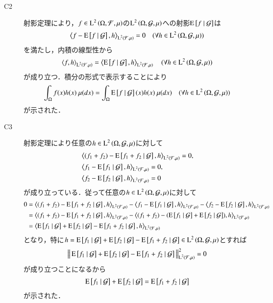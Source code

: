 \begin{prf}
\begin{description}
			\item[C2] 
				射影定理により，$f \in \operatorname{L}^{2} \left(\Omega, \mathcal{F},\mu\right)$の$\operatorname{L}^{2} \left(\Omega, \mathcal{G},\mu\right)$への射影$\operatorname{E} \left[ f \ \middle|\ \mathcal{G} \right]$は
				\begin{align}
					\inprod<f - \cexp{f}{\mathcal{G}}, h>_{\Lp{2}{\mathcal{F},\mu}} = 0 \quad (\forall h \in \Lp{2}{\Omega, \mathcal{G},\mu})
				\end{align}
				を満たし，内積の線型性から
				\begin{align}
					\inprod<f, h>_{\Lp{2}{\mathcal{F},\mu}} = \inprod<\cexp{f}{\mathcal{G}}, h>_{\Lp{2}{\mathcal{F},\mu}} \quad (\forall h \in \Lp{2}{\Omega, \mathcal{G},\mu})
				\end{align}
				が成り立つ．積分の形式で表示することにより
				\begin{align}
					\int_{\Omega} f(x)h(x)\ \mu(dx) = \int_{\Omega} \operatorname{E} \left[ f \ \middle|\ \mathcal{G} \right](x)h(x)\ \mu(dx) \quad (\forall h \in \operatorname{L}^{2} \left(\Omega, \mathcal{G},\mu\right))
				\end{align}
				が示された．
				
			\item[C3] 
				射影定理により任意の$h \in \operatorname{L}^{2} \left(\Omega, \mathcal{G},\mu\right)$に対して
				\begin{align}
					&\inprod<(f_1 + f_2) - \cexp{f_1 + f_2}{\mathcal{G}}, h>_{\Lp{2}{\mathcal{F},\mu}} = 0, \\
					&\inprod<f_1 - \cexp{f_1}{\mathcal{G}}, h>_{\Lp{2}{\mathcal{F},\mu}} = 0, \\
					&\inprod<f_2 - \cexp{f_2}{\mathcal{G}}, h>_{\Lp{2}{\mathcal{F},\mu}} = 0
				\end{align}
				が成り立っている．従って任意の$h \in \operatorname{L}^{2} \left(\Omega, \mathcal{G},\mu\right)$に対して
				\begin{align}
					0 &= \inprod<(f_1 + f_2) - \cexp{f_1 + f_2}{\mathcal{G}}, h>_{\Lp{2}{\mathcal{F},\mu}} - \inprod<f_1 - \cexp{f_1}{\mathcal{G}}, h>_{\Lp{2}{\mathcal{F},\mu}} - \inprod<f_2 - \cexp{f_2}{\mathcal{G}}, h>_{\Lp{2}{\mathcal{F},\mu}} \\
					&= \inprod<(f_1 + f_2) - \cexp{f_1 + f_2}{\mathcal{G}}, h>_{\Lp{2}{\mathcal{F},\mu}} - \inprod<(f_1 + f_2) - (\cexp{f_1}{\mathcal{G}} + \cexp{f_2}{\mathcal{G}}), h>_{\Lp{2}{\mathcal{F},\mu}} \\
					&= \inprod<\cexp{f_1}{\mathcal{G}} + \cexp{f_2}{\mathcal{G}} - \cexp{f_1 + f_2}{\mathcal{G}}, h>_{\Lp{2}{\mathcal{F},\mu}}
				\end{align}
				となり，特に$h = \operatorname{E} \left[ f_1 \ \middle|\ \mathcal{G} \right] + \operatorname{E} \left[ f_2 \ \middle|\ \mathcal{G} \right] - \operatorname{E} \left[ f_1 + f_2 \ \middle|\ \mathcal{G} \right] \in \operatorname{L}^{2} \left(\Omega, \mathcal{G},\mu\right)$とすれば
				\begin{align}
					\left\|\, \operatorname{E} \left[ f_1 \ \middle|\ \mathcal{G} \right] + \operatorname{E} \left[ f_2 \ \middle|\ \mathcal{G} \right] - \operatorname{E} \left[ f_1 + f_2 \ \middle|\ \mathcal{G} \right]\, \right\|_{\operatorname{L}^{2} \left(\mathcal{F},\mu\right)}^2 = 0
				\end{align}
				が成り立つことになるから
				\begin{align}
					\operatorname{E} \left[ f_1 \ \middle|\ \mathcal{G} \right] + \operatorname{E} \left[ f_2 \ \middle|\ \mathcal{G} \right] = \operatorname{E} \left[ f_1 + f_2 \ \middle|\ \mathcal{G} \right]
				\end{align}
				が示された．
				

\end{description}
\end{prf}
